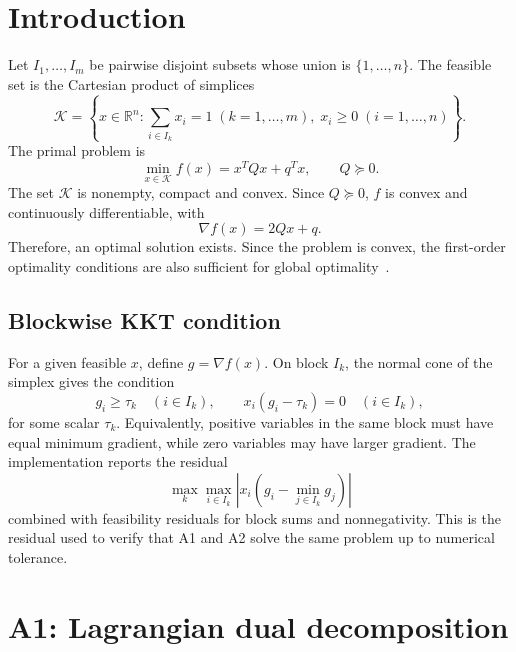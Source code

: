 \documentclass[12pt]{article}
\newcommand{\R}{\mathbb{R}}
\newcommand{\Kset}{\mathcal{K}}
\begin{document}
\tableofcontents
\newpage
{}

\section{Introduction}
Let $I_1,\ldots,I_m$ be pairwise disjoint subsets whose union is $\{1,\ldots,n\}$.  The feasible set is the Cartesian product of simplices
\begin{equation}
\Kset = \left\{x\in\R^n : \sum_{i\in I_k}x_i=1 \; (k=1,\ldots,m),\; x_i\ge 0 \; (i=1,\ldots,n)\right\}.
\end{equation}
The primal problem is
\begin{equation}
\tag{P}
\min_{x\in\Kset} f(x)=x^TQx+q^Tx,
\qquad Q\succeq 0.
\end{equation}
The set $\Kset$ is nonempty, compact and convex.  Since $Q\succeq0$, $f$ is convex and continuously differentiable, with
\begin{equation}
\nabla f(x)=2Qx+q.
\end{equation}
Therefore, an optimal solution exists. Since the problem is convex, the first-order optimality conditions are also sufficient for global optimality~\cite{boyd2004convex}.

\subsection{Blockwise KKT condition}
For a given feasible $x$, define $g=\nabla f(x)$.  On block $I_k$, the normal cone of the simplex gives the condition
\begin{equation}
 g_i \ge \tau_k \quad (i\in I_k),
 \qquad x_i(g_i-\tau_k)=0 \quad (i\in I_k),
\end{equation}
for some scalar $\tau_k$.  Equivalently, positive variables in the same block must have equal minimum gradient, while zero variables may have larger gradient.  The implementation reports the residual
\begin{equation}
\max_k \max_{i\in I_k} |x_i(g_i-\min_{j\in I_k}g_j)|
\end{equation}
combined with feasibility residuals for block sums and nonnegativity.  This is the residual used to verify that A1 and A2 solve the same problem up to numerical tolerance.

\section{A1: Lagrangian dual decomposition}
\end{document}
